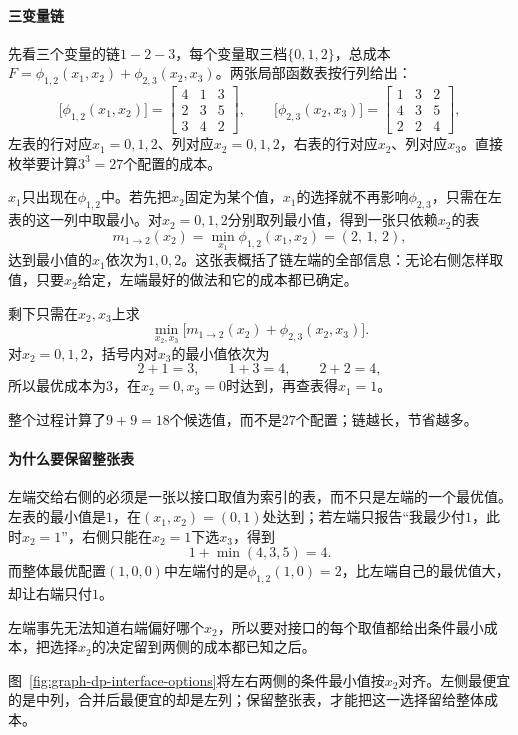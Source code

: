 \paragraph{三变量链}
先看三个变量的链$1-2-3$，每个变量取三档$\{0,1,2\}$，总成本$F=\phi_{1,2}(x_1,x_2)+\phi_{2,3}(x_2,x_3)$。两张局部函数表按行列给出：
\[
\bigl[\phi_{1,2}(x_1,x_2)\bigr]=\begin{bmatrix}4&1&3\\2&3&5\\3&4&2\end{bmatrix},\qquad
\bigl[\phi_{2,3}(x_2,x_3)\bigr]=\begin{bmatrix}1&3&2\\4&3&5\\2&2&4\end{bmatrix},
\]
左表的行对应$x_1=0,1,2$、列对应$x_2=0,1,2$，右表的行对应$x_2$、列对应$x_3$。直接枚举要计算$3^3=27$个配置的成本。

$x_1$只出现在$\phi_{1,2}$中。若先把$x_2$固定为某个值，$x_1$的选择就不再影响$\phi_{2,3}$，只需在左表的这一列中取最小。对$x_2=0,1,2$分别取列最小值，得到一张只依赖$x_2$的表
\[
m_{1\to2}(x_2)=\min_{x_1}\phi_{1,2}(x_1,x_2)=(2,\,1,\,2),
\]
达到最小值的$x_1$依次为$1,0,2$。这张表概括了链左端的全部信息：无论右侧怎样取值，只要$x_2$给定，左端最好的做法和它的成本都已确定。

剩下只需在$x_2,x_3$上求
\[
\min_{x_2,x_3}\bigl[m_{1\to2}(x_2)+\phi_{2,3}(x_2,x_3)\bigr].
\]
对$x_2=0,1,2$，括号内对$x_3$的最小值依次为
\[
2+1=3,\qquad 1+3=4,\qquad 2+2=4,
\]
所以最优成本为$3$，在$x_2=0,x_3=0$时达到，再查表得$x_1=1$。

整个过程计算了$9+9=18$个候选值，而不是$27$个配置；链越长，节省越多。

\paragraph{为什么要保留整张表}
左端交给右侧的必须是一张以接口取值为索引的表，而不只是左端的一个最优值。左表的最小值是$1$，在$(x_1,x_2)=(0,1)$处达到；若左端只报告“我最少付$1$，此时$x_2=1$”，右侧只能在$x_2=1$下选$x_3$，得到
\[
1+\min(4,3,5)=4.
\]
而整体最优配置$(1,0,0)$中左端付的是$\phi_{1,2}(1,0)=2$，比左端自己的最优值大，却让右端只付$1$。

左端事先无法知道右端偏好哪个$x_2$，所以要对接口的每个取值都给出条件最小成本，把选择$x_2$的决定留到两侧的成本都已知之后。

图~\ref{fig:graph-dp-interface-options}将左右两侧的条件最小值按$x_2$对齐。左侧最便宜的是中列，合并后最便宜的却是左列；保留整张表，才能把这一选择留给整体成本。

